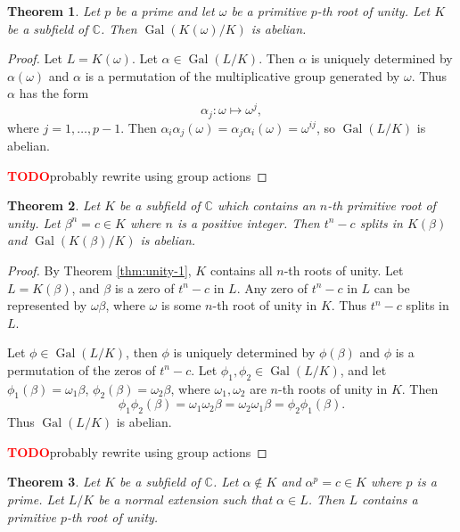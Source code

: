\documentclass[12pt]{article}
\newtheorem{theorem}{Theorem}
\theoremstyle{definition}
\newcommand{\Gal}{\operatorname{Gal}}
\newcommand{\TODO}{\textbf{\textcolor{red}{TODO}}}
\begin{document}
\begin{theorem} \label{thm:radical-1}
	Let $p$ be a prime and let $\omega$ be a primitive $p$-th root of unity. Let $K$ be a subfield of $\mathbb C$. Then $\Gal(K(\omega) / K)$ is abelian.
\end{theorem}
\begin{proof}
	Let $L = K(\omega)$.  Let $\alpha \in \Gal(L / K)$. Then $\alpha$ is uniquely determined by $\alpha(\omega)$ and $\alpha$ is a permutation of the multiplicative group generated by $\omega$. Thus $\alpha$ has the form
	$$
	\alpha_j: \omega \mapsto \omega^j,
	$$
	where $j=1,\dots,p-1$. Then $\alpha_i \alpha_j (\omega) = \alpha_j \alpha_i (\omega) = \omega^{i j}$, so $ \Gal(L / K)$ is abelian.
	
	\TODO probably rewrite using group actions
\end{proof}

\begin{theorem} \label{thm:radical-2}
	Let $K$ be a subfield of $\mathbb{C}$ which contains an $n$-th primitive root of unity. Let $\beta^n = c \in K $ where $n$ is a positive integer. Then $t^n - c$ splits in $K(\beta)$ and $\Gal(K(\beta) / K)$ is abelian.
\end{theorem}

\begin{proof}
	By Theorem \ref{thm:unity-1}, $K$ contains all $n$-th roots of unity. Let $L = K(\beta)$, and $\beta$ is a zero of $t^n-c$ in $L$. Any zero of $t^n-c$ in $L$ can be represented by $\omega \beta$, where $\omega$ is some $n$-th root of unity in $K$. Thus $t^n - c$ splits in $L$.  
	
	Let $\phi \in \Gal(L / K)$, then $\phi$ is uniquely determined by $\phi(\beta)$ and $\phi$ is a permutation of the zeros of $t^n - c$. Let $\phi_1, \phi_2 \in \Gal(L / K)$, and let $\phi_1(\beta) = \omega_1\beta$, $\phi_2(\beta) = \omega_2\beta$, where $\omega_1, \omega_2$ are $n$-th roots of unity in $K$. Then
	$$
	\phi_1 \phi_2(\beta)=\omega_1 \omega_2 \beta=\omega_2 \omega_1  \beta=\phi_2 \phi_1(\beta).
	$$
	Thus $\Gal(L / K)$ is abelian.
	
	\TODO probably rewrite using group actions
\end{proof}

\begin{theorem} \label{thm:unity-3}
	Let $K$ be a subfield of $\mathbb C$. Let $\alpha \notin K$ and $\alpha^p = c \in K$ where $p$ is a prime. Let $L / K$ be a normal extension such that $\alpha \in L$. Then $L$ contains a primitive $p$-th root of unity.
\end{theorem}
\end{document}
